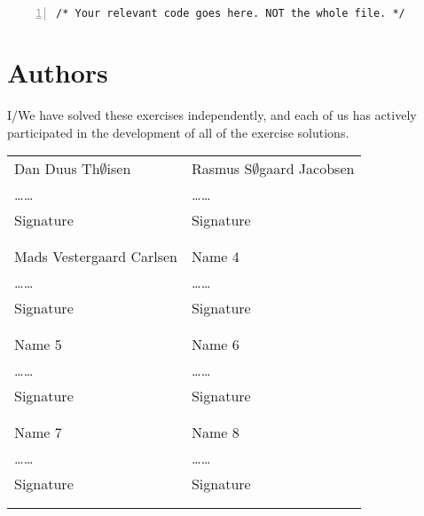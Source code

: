 \documentclass{article}
\begin{document}
\begin{lstlisting}[basicstyle=\small\sffamily,
keywords={break,case,const,continue,default,else,enum,
for,if,return,switch,while,do,long,void,int,float,double,
char,struct,typedef,include,size\_t},
keywordstyle={\color{blue}},
comment={[l]{//}}, morecomment={[s]{/*}{*/}}, commentstyle=\itshape,
columns={[l]flexible}, numbers=left, numberstyle=\tiny,
frameround=fftt, frame=shadowbox, captionpos=b,
caption={Matrix inversion with barriers.},
label=LST:invmat2]
/* Your relevant code goes here. NOT the whole file. */
\end{lstlisting}


\newpage
\section{Authors}
I/We have solved these exercises independently, and each of us has actively
participated in the development of all of the exercise solutions.
\vspace{1cm}

\noindent
\begin{tabular}{p{70mm}p{70mm}}

%
%

Dan Duus Th$\emptyset$isen & Rasmus S$\emptyset$gaard Jacobsen \\
\dots\dotfill\dots & \dots\dotfill\dots \\
Signature & Signature \\
& \\
& \\

Mads Vestergaard Carlsen & Name 4 \\
\dots\dotfill\dots & \dots\dotfill\dots \\
Signature & Signature \\
& \\
& \\

Name 5 & Name 6 \\
\dots\dotfill\dots & \dots\dotfill\dots \\
Signature & Signature \\
& \\
& \\

Name 7 & Name 8 \\
\dots\dotfill\dots & \dots\dotfill\dots \\
Signature & Signature \\
& \\
& \\
\end{tabular}
\end{document}
